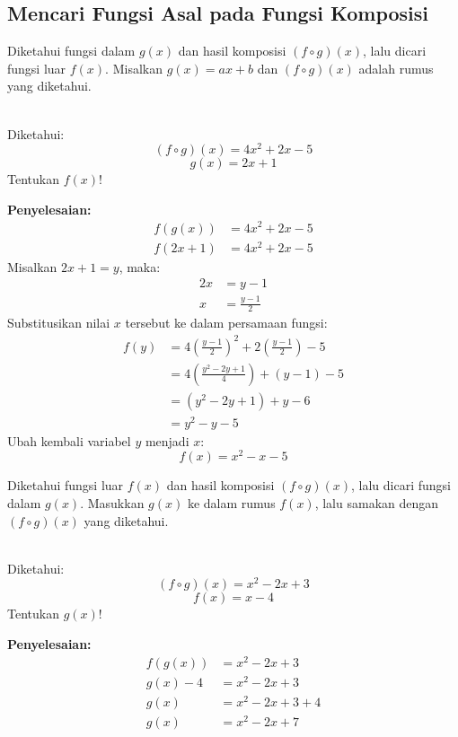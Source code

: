 \subsection{Mencari Fungsi Asal pada Fungsi Komposisi}
\begin{definition}
  Diketahui fungsi dalam $g(x)$ dan hasil komposisi $(f \circ g)(x)$, lalu dicari fungsi luar $f(x)$. Misalkan $g(x) = ax + b$ dan $(f \circ g)(x)$ adalah rumus yang diketahui.
\end{definition}

\begin{example}[Kasus 1]
  \hfill \\
  Diketahui:
  \[ (f \circ g)(x) = 4x^2 + 2x - 5 \]
  \[ g(x) = 2x + 1 \]
  Tentukan $f(x)$!
  
  \textbf{Penyelesaian:}
  \[
  \begin{aligned}
    f(g(x)) &= 4x^2 + 2x - 5 \\
    f(2x + 1) &= 4x^2 + 2x - 5
  \end{aligned}
  \]
  Misalkan $2x + 1 = y$, maka:
  \[
  \begin{aligned}
    2x &= y - 1 \\
    x &= \frac{y - 1}{2}
  \end{aligned}
  \]
  Substitusikan nilai $x$ tersebut ke dalam persamaan fungsi:
  \[
  \begin{aligned}
    f(y) &= 4 \left(\frac{y - 1}{2}\right)^2 + 2\left(\frac{y - 1}{2}\right) - 5 \\
    &= 4 \left(\frac{y^2 - 2y + 1}{4}\right) + (y - 1) - 5 \\
    &= (y^2 - 2y + 1) + y - 6 \\
    &= y^2 - y - 5
  \end{aligned}
  \]
  Ubah kembali variabel $y$ menjadi $x$:
  \[ f(x) = x^2 - x - 5 \]
\end{example}

\begin{definition}
  Diketahui fungsi luar $f(x)$ dan hasil komposisi $(f \circ g)(x)$, lalu dicari fungsi dalam $g(x)$. Masukkan $g(x)$ ke dalam rumus $f(x)$, lalu samakan dengan $(f \circ g)(x)$ yang diketahui.
\end{definition}

\begin{example}[Kasus 2]
  \hfill \\
  Diketahui:
  \[ (f \circ g)(x) = x^2 - 2x + 3 \]
  \[ f(x) = x - 4 \]
  Tentukan $g(x)$!
  
  \textbf{Penyelesaian:}
  \[
  \begin{aligned}
    f(g(x)) &= x^2 - 2x + 3 \\
    g(x) - 4 &= x^2 - 2x + 3 \\
    g(x) &= x^2 - 2x + 3 + 4 \\
    g(x) &= x^2 - 2x + 7
  \end{aligned}
  \]
\end{example}
